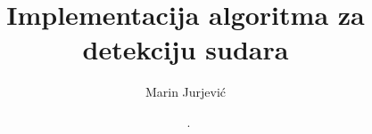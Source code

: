 


%




\frontmatter   %



\title{Implementacija algoritma za detekciju sudara}   %

\date{\MONTH~\the\year.}   %

\author{Marin Jurjević}  %
\maketitle		%
\maketitleabstract
\begin{assignmentpage}
\end{assignmentpage}

\begin{honestystatementpage}
	
\end{honestystatementpage}

\begin{acknowledgments} %
	  
\end{acknowledgments}

\tableofcontents
\listoffigures
\clearpage
{}
\lstlistoflistings
\listofalgorithms
{}






